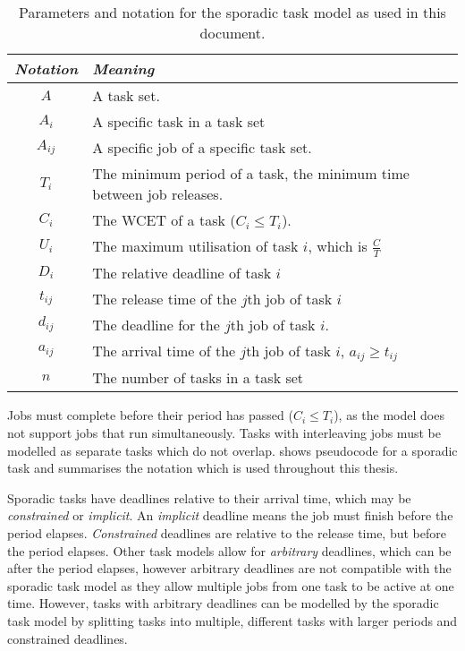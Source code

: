 \begin{table}
\centering
    \begin{tabular}{cp{}}\toprule
    \emph{Notation} & \emph{Meaning} \\\midrule
    $A$               & A task set. \\
    $A_{i}$           & A specific task in a task set \\
    $A_{ij}$          & A specific job of a specific task set. \\
    $T_{i}$           & The minimum period of a task, the minimum time between job releases. \\
        $C_{i}$       & The \gls{WCET} of a task ($C_{i} \leq T_{i}$). \\
    $U_{i}$           & The maximum utilisation of task $i$, which is $\frac{C}{T}$ \\
    $D_{i}$           & The relative deadline of task $i$ \\
    $t_{ij}$          & The release time of the $j$th job of task $i$ \\
    $d_{ij}$          & The deadline for the $j$th job of task $i$. \\
    $a_{ij}$          & The arrival time of the $j$th job of task $i$, $a_{ij} \geq t_{ij}$ \\
    $n$               & The number of tasks in a task set\\
    \bottomrule
    \end {tabular}
    \caption{Parameters and notation for the sporadic task model as used in this document.}
    \label{t:notation}
\end{table}

Jobs must complete before their period has passed ($C_{i} \leq T_{i}$), as the model does not
support jobs that run simultaneously. Tasks with interleaving jobs must be modelled as separate
tasks which do not overlap.   shows pseudocode for a sporadic task and
 summarises the notation which is used throughout this thesis.

Sporadic tasks have deadlines relative to their arrival time, which may be \emph{constrained} or
\emph{implicit}.  An \emph{implicit} deadline means the job must finish before the period elapses.
\emph{Constrained} deadlines are relative to the release time, but before the period elapses.  Other
task models allow for \emph{arbitrary} deadlines, which can be after the period elapses, however
arbitrary deadlines are not compatible with the sporadic task model as they allow multiple jobs from
one task to be active at one time.  However, tasks with arbitrary deadlines can be modelled by the
sporadic task model by splitting tasks into multiple, different tasks with larger periods and
constrained deadlines.

